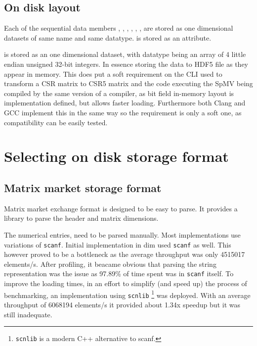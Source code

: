 \documentclass[thesis=M,english]{FITthesis}[2019/12/23]
\begin{document}

\subsection{On disk layout}

Each of the sequential data members , , , ,
, , are stored as one dimensional datasets of same name
and same datatype.  is stored as an attribute.

 is stored as an one dimensional dataset, with datatype being
an array of 4 little endian unsigned 32-bit integers. In essence storing the data to HDF5 file as
they appear in memory. This does put a soft requirement on the CLI used to transform a CSR matrix to
CSR5 matrix and the code executing the SpMV being compiled by the same version of a compiler, as
bit field in-memory layout is implementation defined, but allows faster loading. Furthermore both
Clang and GCC implement this in the same way so the requirement is only a soft one, as compatibility can
be easily tested.


\section{Selecting on disk storage format}


\subsection{Matrix market storage format}

Matrix market exchange format is designed to be easy to parse. It provides a library to parse
the header and matrix dimensions. \cite{mmC}

The numerical entries, need to be parsed manually.
Most implementations use variations of \texttt{scanf}.
Initial implementation in dim used \texttt{scanf} as well. This however proved to be a bottleneck as
the average throughput was only 4515017 elements/s.  After profiling, it beacame obvious that parsing the string representation
was the issue as 97.89\% of time spent was in \texttt{scanf} itself.
To improve the loading times, in an effort to
simplify (and speed up) the process of benchmarking, an implementation using
\texttt{scnlib} \footnote{\texttt{scnlib} is a modern C++ alternative to scanf.}
was deployed. With an average throughput of 6068194 elements/s it provided about 1.34x speedup but it was still inadequate.
\end{document}
